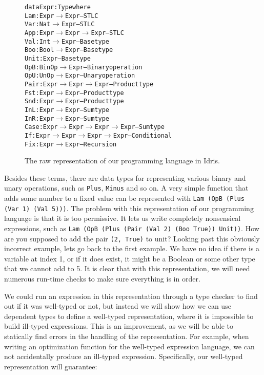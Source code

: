 \begin{center}
\begin{figure}
\begin{alltt}
data Expr : Type where
  Lam  : Expr \(\to\) Expr                 -- STLC
  Var  : Nat \(\to\) Expr                  -- STLC
  App  : Expr \(\to\) Expr \(\to\) Expr         -- STLC
  Val  : Int \(\to\) Expr                  -- Base type
  Boo  : Bool \(\to\) Expr                 -- Base type
  Unit : Expr                         -- Base type
  OpB  : BinOp \(\to\) Expr                -- Binary operation
  OpU  : UnOp \(\to\) Expr                 -- Unary operation
  Pair : Expr \(\to\) Expr \(\to\) Expr         -- Product type
  Fst  : Expr \(\to\) Expr                 -- Product type
  Snd  : Expr \(\to\) Expr                 -- Product type
  InL  : Expr \(\to\) Expr                 -- Sum type
  InR  : Expr \(\to\) Expr                 -- Sum type
  Case : Expr \(\to\) Expr \(\to\) Expr \(\to\) Expr -- Sum type
  If   : Expr \(\to\) Expr \(\to\) Expr \(\to\) Expr -- Conditional
  Fix  : Expr \(\to\) Expr                 -- Recursion
\end{alltt}
\caption{The raw representation of our programming language in Idris.}
\label{fig:rstlc}
\end{figure}
\end{center}

Besides these terms, there are data types for representing various binary and unary operations, such as \texttt{Plus}, \texttt{Minus} and so on. A very simple function that adds some number to a fixed value can be represented with \texttt{Lam (OpB (Plus (Var 1) (Val 5)))}. The problem with this representation of our programming language is that it is too permissive. It lets us write completely nonsensical expressions, such as \texttt{Lam (OpB (Plus (Pair (Val 2) (Boo True)) Unit))}. How are you supposed to add the pair \texttt{(2, True)} to unit? Looking past this obviously incorrect example, lets go back to the first example. We have no idea if there is a variable at index 1, or if it does exist, it might be a Boolean or some other type that we cannot add to 5. It is clear that with this representation, we will need numerous run-time checks to make sure everything is in order. 

We could run an expression in this representation through a type checker to find out if it was well-typed or not, but instead we will show how we can use dependent types to define a well-typed representation, where it is impossible to build ill-typed expressions. This is an improvement, as we will be able to statically find errors in the handling of the representation. For example, when writing an optimization function for the well-typed expression language, we can not accidentally produce an ill-typed expression. Specifically, our well-typed representation will guarantee:

